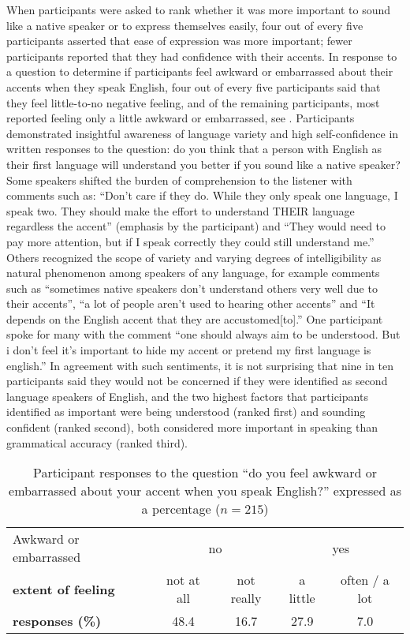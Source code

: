 \documentclass[output=paper,colorlinks,citecolor=brown]{langscibook}
\begin{document}
When participants were asked to rank whether it was more important to sound like a native speaker or to express themselves easily, four out of every five participants asserted that ease of expression was more important; fewer participants reported that they had confidence with their accents. In response to a question to determine if participants feel awkward or embarrassed about their accents when they speak English, four out of every five participants said that they feel little-to-no negative feeling, and of the remaining participants, most reported feeling only a little awkward or embarrassed, see . Participants demonstrated insightful awareness of language variety and high self-confidence in written responses to the question: do you think that a person with English as their first language will understand you better if you sound like a native speaker? Some speakers shifted the burden of comprehension to the listener with comments such as: “Don’t care if they do. While they only speak one language, I speak two. They should make the effort to understand THEIR language regardless the accent” (emphasis by the participant) and “They would need to pay more attention, but if I speak correctly they could still understand me.” Others recognized the scope of variety and varying degrees of intelligibility as natural phenomenon among speakers of any language, for example comments such as “sometimes native speakers don’t understand others very well due to their accents”, “a lot of people aren't used to hearing other accents” and “It depends on the English accent that they are accustomed[to].” One participant spoke for many with the comment “one should always aim to be understood. But i don’t feel it’s important to hide my accent or pretend my first language is english.” In agreement with such sentiments, it is not surprising that nine in ten participants said they would not be concerned if they were identified as second language speakers of English, and the two highest factors that participants identified as important were being understood (ranked first) and sounding confident (ranked second), both considered more important in speaking than grammatical accuracy (ranked third).

\begin{table}[!ht]
\centering
\begin{tabular}{lcccc}
    \toprule
    \multicolumn{1}{l}{Awkward or embarrassed} & \multicolumn{2}{c}{no}    & \multicolumn{2}{c}{yes} \\ \cmidrule{2-5}
    \textbf{extent of feeling} & not at all & not really & a little & often / a lot \\
    \textbf{responses (\%)} & 48.4 & 16.7 & 27.9 & 7.0 \\ \bottomrule
\end{tabular}
\caption{Participant responses to the question “do you feel awkward or embarrassed about your accent when you speak English?” expressed as a percentage ($n=215$)}
\label{tab:tab7_07}
\end{table}
\end{document}
